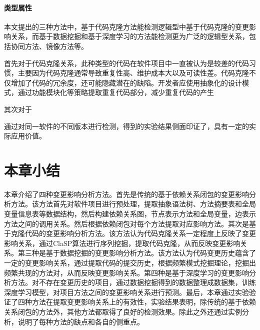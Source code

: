 \paragraph{类型属性} 本文提出的三种方法中，基于代码克隆方法能检测逻辑型中基于代码克隆的变更影响关系，而基于数据挖掘和基于深度学习的方法能检测更为广泛的逻辑型关系，包括协同方法、镜像方法等。

首先对于代码克隆关系，此种类型的代码在软件项目中一直被认为是较差的代码习惯，主要因为代码克隆通常导致重复性高、维护成本大以及可读性差。代码克隆不仅增加了代码的冗余度，还可能隐藏潜在的缺陷。开发者应使用抽象化的设计模式，通过功能模块化等策略提取重复代码部分，减少重复代码的产生

其次对于


通过对同一软件的不同版本进行检测，得到的实验结果侧面印证了，具有一定的实际应用价值。

\section{本章小结}

本章介绍了四种变更影响分析方法。首先是传统的基于依赖关系闭包的变更影响分析方法。该方法首先对软件项目进行预处理，提取抽象语法树、方法摘要表和全局变量信息表等数据结构，然后构建依赖关系图，节点表示方法和全局变量，边表示方法之间的调用关系。然后根据依赖闭包对每个方法提取对应影响方法。其次是基于克隆代码的变更影响分析方法。该方法认为代码克隆关系一定程度上反映了变更影响关系，通过ClaSP算法进行序列挖掘，提取代码克隆，从而反映变更影响关系。第三种是基于数据挖掘的变更影响分析方法。该方法认为代码变更历史蕴含了一定的变更影响关系，通过提取代码的提交历史，根据频繁模式挖掘理论，挖掘出频繁共现的方法对，从而反映变更影响关系。第四种是基于深度学习的变更影响分析方法。对不存在变更历史的项目，通过数据挖掘得到的数据整理成数据集，训练深度学习模型，对项目方法之间的变更影响关系进行预测。最后，本章通过实验验证了四种方法在提取变更影响关系上的有效性，实验结果表明，除传统的基于依赖关系闭包的方法外，其他方法都取得了良好的检测效果。除此之外还通过实例分析，说明了每种方法的缺点和各自的侧重点。

